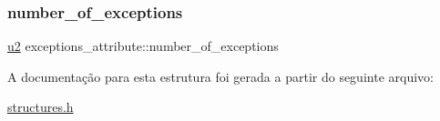 \subsubsection{\texorpdfstring{number\+\_\+of\+\_\+exceptions}{number\_of\_exceptions}}
{\footnotesize\ttfamily \hyperlink{lista__operandos_8h_a732cde1300aafb73b0ea6c2558a7a54f}{u2} exceptions\+\_\+attribute\+::number\+\_\+of\+\_\+exceptions}



A documentação para esta estrutura foi gerada a partir do seguinte arquivo\+:\begin{DoxyCompactItemize}
\item 
\hyperlink{structures_8h}{structures.\+h}\end{DoxyCompactItemize}
